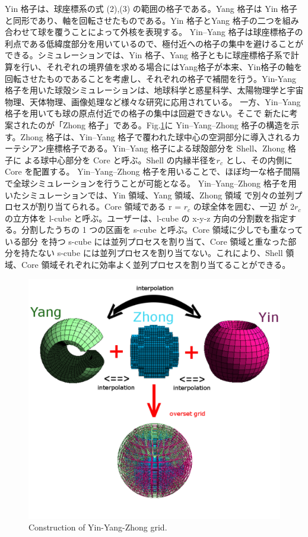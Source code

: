 \documentclass[12pt]{jsarticle}
\begin{document}
Yin 格子は、球座標系の式 (2),(3) の範囲の格子である。Yang 格子は Yin 格子と同形であり、軸を回転させたものである。Yin 格子とYang 格子の二つを組み合わせて球を覆うことによって外核を表現する。 Yin--Yang 格子は球座標格子の利点である低緯度部分を用いているので、極付近への格子の集中を避けることができる。シミュレーションでは、Yin 格子、Yang 格子ともに球座標格子系で計算を行い、それぞれの境界値を求める場合にはYang格子が本来、Yin格子の軸を回転させたものであることを考慮し、それぞれの格子で補間を行う。Yin-Yang 格子を用いた球殻シミュレーションは、地球科学と惑星科学\cite{peng2006conservative}、太陽物理学と宇宙物理\cite{shiota2010magnetohydrodynamic}、天体物理\cite{wongwathanarat2010axis}、画像処理\cite{hara2015gradient}など様々な研究に応用されている。
一方、Yin--Yang 格子を用いても球の原点付近での格子の集中は回避できない。そこで 新たに考案されたのが「Zhong 格子」である。Fig.\ref{fig:YYZthesis}に Yin--Yang--Zhong 格子の構造を示す。Zhong 格子は、Yin--Yang 格子で覆われた球中心の空洞部分に導入されるカーテシアン座標格子である。Yin--Yang 格子による球殻部分を Shell、Zhong 格子に よる球中心部分を Core と呼ぶ。Shell の内縁半径を$r_{c}$ とし、その内側に Core を配置する。 Yin--Yang--Zhong 格子を用いることで、ほぼ均一な格子間隔で全球シミュレーションを行うことが可能となる。
Yin--Yang--Zhong 格子を用いたシミュレーションでは、Yin 領域、Yang 領域、Zhong 領域 で別々の並列プロセスが割り当てられる。Core 領域である r = $r_{c}$ の球全体を囲む、一辺 が 2$r_{c}$ の立方体を l-cube と呼ぶ。ユーザーは、l-cube の x-y-z 方向の分割数を指定す る。分割したうちの 1 つの区画を s-cube と呼ぶ。Core 領域に少しでも重なっている部分 を持つ s-cube には並列プロセスを割り当て、Core 領域と重なった部分を持たない s-cube には並列プロセスを割り当てない。これにより、Shell 領域、Core 領域それぞれに効率よく並列プロセスを割り当てることができる。

\begin{figure}[H]
\centering
\includegraphics[height=0.75\textheight,width=1.0\hsize,angle=0,keepaspectratio]{./Image/YYZthesis.pdf}
\caption{Construction of Yin-Yang-Zhong grid.} \label{fig:YYZthesis}
\end{figure}
\end{document}
